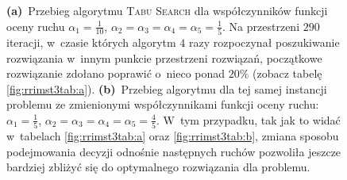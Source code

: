 \begin{figure}[!h]
{		 \textbf{(a)}~Przebieg algorytmu \textsc{Tabu Search} dla współczynników funkcji oceny ruchu $\alpha_{1} = \frac{1}{10}$, $\alpha_{2} = \alpha_{3} = \alpha_{4} = \alpha_{5} = \frac{1}{5}$. Na przestrzeni $290$ iteracji, w~czasie których algorytm $4$ razy rozpoczynał poszukiwanie rozwiązania w~innym punkcie przestrzeni rozwiązań, początkowe rozwiązanie zdołano poprawić o~nieco ponad $20\%$ (zobacz tabelę \ref{fig:rrimst3tab:a}).
		 \textbf{(b)}~Przebieg algorytmu dla tej samej instancji problemu ze zmienionymi współczynnikami funkcji oceny ruchu: $\alpha_{1} = \frac{1}{5}$, $\alpha_{2} = \alpha_{3} = \alpha_{4} = \alpha_{5} = \frac{4}{5}$. W~tym przypadku, tak jak to widać w~tabelach \ref{fig:rrimst3tab:a} oraz \ref{fig:rrimst3tab:b}, zmiana sposobu podejmowania decyzji odnośnie następnych ruchów pozwoliła jeszcze bardziej zbliżyć się do optymalnego rozwiązania dla problemu.
	}
	\label{fig:rrimst3}
\end{figure}

